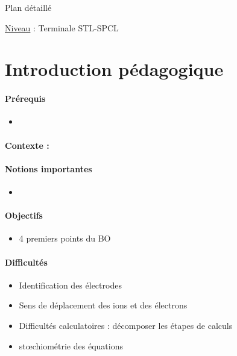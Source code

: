 \begin{reportBlock}{Plan détaillé}

\underline{Niveau} : Terminale STL-SPCL \\

\section*{Introduction pédagogique}


\paragraph*{Prérequis}
\begin{itemize}
\item 
\end{itemize}
\paragraph*{Contexte :}


\paragraph*{Notions importantes}

\begin{itemize}
\item 
\end{itemize}

\paragraph*{Objectifs}

\begin{itemize}
\item 4 premiers points du BO
\end{itemize}

\paragraph*{Difficultés}

\begin{itemize}
\item Identification des électrodes
\item Sens de déplacement des ions et des électrons
\item Difficultés calculatoires : décomposer les étapes de calculs
\item st\oe chiométrie des équations
\end{itemize}


\end{reportBlock}
